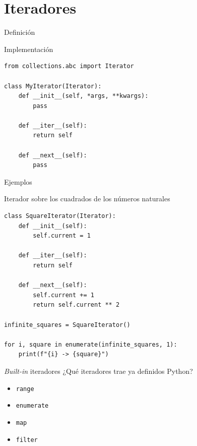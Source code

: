 \documentclass[12pt]{beamer}
\begin{document}
\section{Iteradores}
\begin{frame}[fragile]{Definición}
\begin{block}{Implementación}
\begin{verbatim}
from collections.abc import Iterator

class MyIterator(Iterator):
    def __init__(self, *args, **kwargs):
        pass

    def __iter__(self):
        return self

    def __next__(self):
        pass
\end{verbatim}
\end{block}   
\end{frame}

\begin{frame}[fragile]{Ejemplos}
\begin{block}{Iterador sobre los cuadrados de los números naturales}
\begin{verbatim}
class SquareIterator(Iterator):
    def __init__(self):
        self.current = 1

    def __iter__(self):
        return self

    def __next__(self):
        self.current += 1
        return self.current ** 2

infinite_squares = SquareIterator()

for i, square in enumerate(infinite_squares, 1):
    print(f"{i} -> {square}")
\end{verbatim}
\end{block}   
\end{frame}

\begin{frame}[fragile]{\textit{Built-in} iteradores}
¿Qué iteradores trae ya definidos Python?
\begin{itemize}
    \item \texttt{range}
    \item \texttt{enumerate}
    \item \texttt{map}
    \item \texttt{filter}
\end{itemize}
\end{frame}
\end{document}
